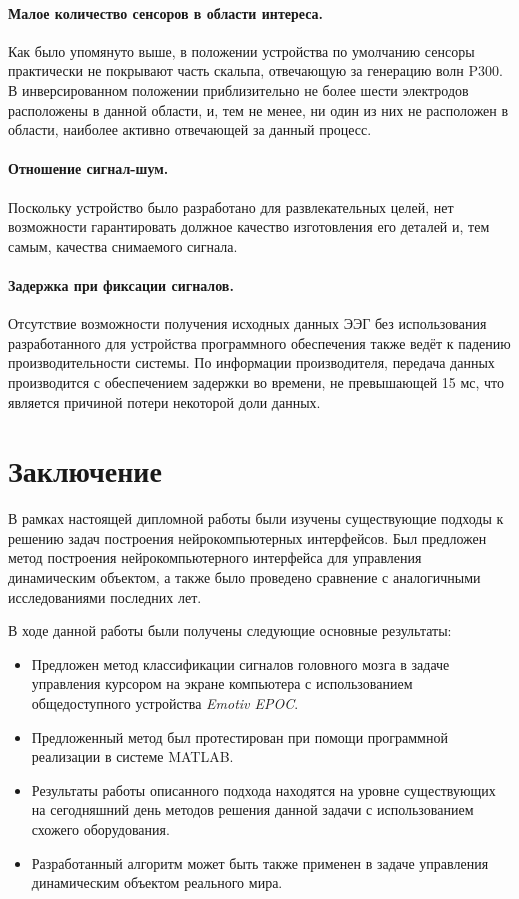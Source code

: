 \documentclass[12pt,a4paper,oneside,fleqn,leqno]{article}
\begin{document}
	\paragraph{Малое количество сенсоров в области интереса.}
	\par Как было упомянуто выше, в положении устройства по умолчанию сенсоры практически не покрывают часть скальпа, отвечающую за генерацию волн P300. В инверсированном положении приблизительно не более шести электродов расположены в данной области, и, тем не менее, ни один из них не расположен в области, наиболее активно отвечающей за данный процесс.
	\paragraph{Отношение сигнал-шум.}
	\par Поскольку устройство было разработано для развлекательных целей, нет возможности гарантировать должное качество изготовления его деталей и, тем самым, качества снимаемого сигнала.
	\paragraph{Задержка при фиксации сигналов.}
	\par Отсутствие возможности получения исходных данных ЭЭГ без использования разработанного для устройства программного обеспечения также ведёт к падению производительности системы. По информации производителя, передача данных производится с обеспечением задержки во времени, не превышающей 15 мс, что является причиной потери некоторой доли данных.
\newpage
\section{Заключение}
	\par В рамках настоящей дипломной работы были изучены существующие подходы к решению задач построения нейрокомпьютерных интерфейсов. Был предложен метод построения нейрокомпьютерного интерфейса для управления динамическим объектом, а также было проведено сравнение с аналогичными исследованиями последних лет.
	\par В ходе данной работы были получены следующие основные результаты:
	\begin{itemize}\itemsep0pt
		\item
		Предложен метод классификации сигналов головного мозга в задаче управления курсором на экране компьютера с использованием общедоступного устройства {\it Emotiv EPOC}.
		\item
		Предложенный метод был протестирован при помощи программной реализации в системе MATLAB.
		\item
		Результаты работы описанного подхода находятся на уровне существующих на сегодняшний день методов решения данной задачи с использованием схожего оборудования.
		\item
		Разработанный алгоритм может быть также применен в задаче управления динамическим объектом реального мира.
	\end{itemize}\par
\end{document}
